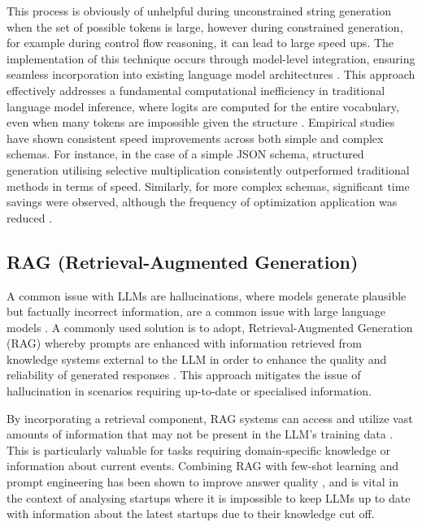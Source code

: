 \documentclass[a4paper, oneside]{discothesis}
\begin{document}
This process is obviously of unhelpful during unconstrained string generation when the set of possible tokens is large, however during constrained generation, for example during control flow reasoning, it can lead to large speed ups. The implementation of this technique occurs through model-level integration, ensuring seamless incorporation into existing language model architectures \cite{chaudhari2023logit}. This approach effectively addresses a fundamental computational inefficiency in traditional language model inference, where logits are computed for the entire vocabulary, even when many tokens are impossible given the structure \cite{willard2023efficient}. Empirical studies have shown consistent speed improvements across both simple and complex schemas. For instance, in the case of a simple JSON schema, structured generation utilising selective multiplication consistently outperformed traditional methods in terms of speed. Similarly, for more complex schemas, significant time savings were observed, although the frequency of optimization application was reduced \cite{chaudhari2023logit}.

\subsection{RAG (Retrieval-Augmented Generation)}
A common issue with LLMs are hallucinations, where models generate plausible but factually incorrect information, are a common issue with large language models \cite{maynez2020faithfulness}. A commonly used solution is to adopt, Retrieval-Augmented Generation (RAG) whereby prompts are enhanced with information retrieved from knowledge systems external to the LLM in order to enhance the quality and reliability of generated responses \cite{lewis2020retrieval}. This approach mitigates the issue of hallucination in scenarios requiring up-to-date or specialised information.

By incorporating a retrieval component, RAG systems can access and utilize vast amounts of information that may not be present in the LLM's training data \cite{lewis2020retrieval}. This is particularly valuable for tasks requiring domain-specific knowledge or information about current events.
Combining RAG with few-shot learning and prompt engineering has been shown to improve answer quality \cite{liu2021pre}, and is vital in the context of analysing startups where it is impossible to keep LLMs up to date with information about the latest startups due to their knowledge cut off.
\end{document}
